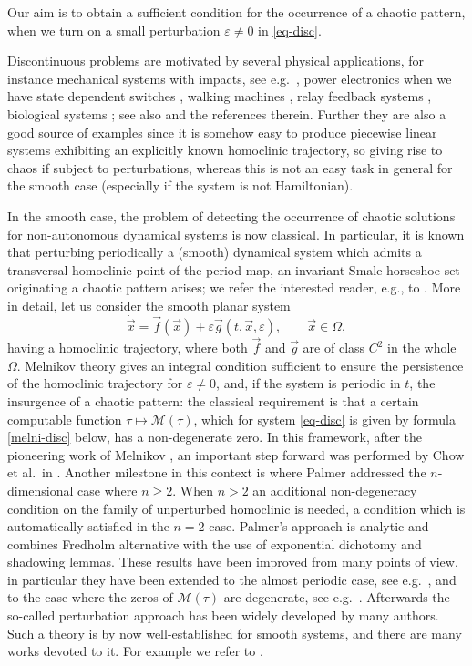 \documentclass[10pt]{article}
\numberwithin{equation}{section}
\def\ep{\varepsilon}
\def\Om{\Omega}
\def\MM{{\mathcal M}}
\def\x{\vec{x}}
\def\f{\vec{f}}
\def\g{\vec{g}}
\theoremstyle{definition}
\theoremstyle{remark}
\begin{document}
Our  aim is to obtain a sufficient condition for the occurrence of a chaotic pattern, when we turn on a small perturbation $\ep \ne 0$ in
\eqref{eq-disc}.

Discontinuous problems are motivated by several physical applications, for instance mechanical systems with impacts, see e.g.~\cite{B99},
power electronics when we
have state dependent switches \cite{BV01}, walking machines \cite{GCRC98}, relay feedback systems \cite{BGV02}, biological systems \cite{PK};
see also \cite{DE13, LSZH16} and
the references therein.
Further they are also a  good source of examples since it is somehow easy to produce piecewise linear systems exhibiting an explicitly known
homoclinic
trajectory, so giving rise to chaos if subject to perturbations, whereas this is not an easy task in general for the smooth case (especially
if
the system
is not Hamiltonian).

In the smooth case, the problem of detecting the occurrence of chaotic solutions for non-autonomous dynamical systems is now classical.
In particular, it is
known that  perturbing periodically a (smooth) dynamical system
which admits a transversal homoclinic point of the period map, an invariant Smale horseshoe set originating a chaotic pattern arises; we
refer the interested reader, e.g.,
to \cite{Pa84, GH, WigBook, Wig99, SSTC}.
 More in detail,  let us consider the smooth planar system
\begin{equation}\label{eq-smooth}\tag{S}
	\dot{\x}=\f (\x)+\ep\g(t,\x,\ep), \quad \quad \x\in\Om,
\end{equation}
 having a homoclinic trajectory,  where both $\f$ and $\g$ are of class  $C^2$  in the whole $\Om$.
Melnikov theory gives an  integral condition   sufficient to ensure the persistence
of the homoclinic trajectory for $\ep \ne 0$, and, if the system is periodic in $t$, the insurgence of a chaotic pattern:
the classical requirement is that a certain computable function $\tau\mapsto\MM(\tau)$, which for system \eqref{eq-disc} is given by formula
\eqref{melni-disc} below, has a
non-degenerate zero.
In this framework, after the pioneering work of Melnikov \cite{Me}, an important step forward
was performed by Chow et al.\ in \cite{CHM}.
Another milestone in this context is \cite{Pa84} where Palmer  addressed the
$n$-dimensional case where $n \ge 2$.
When $n>2$ an additional non-degeneracy condition on the family of unperturbed homoclinic is needed,
a condition which is automatically satisfied in the $n=2$ case. Palmer's approach is analytic and combines
Fredholm alternative with the use of exponential dichotomy and shadowing lemmas.
These results have been improved from many points of view, in particular they have been extended to the almost periodic case,
see e.g.\ \cite{Sch, PS},  and to the case where the zeros of $\MM(\tau)$ are degenerate, see e.g.\ \cite{BF02C, BF02M}.
Afterwards
the so-called perturbation approach has been widely developed by many authors.
Such a theory is by now well-established for smooth systems, and there are many works devoted to it.
For example we refer to \cite{BL,CHM,G1,GH, Pa84, Pa00, PS,Sch, St,MS,WigBook, Wig99}.
\end{document}
